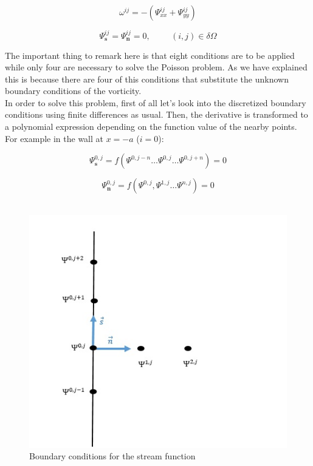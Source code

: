 \begin {equation} \label{cont4}
\omega^{ij}= - (\Psi^{ij} _{xx} + \Psi^{ij} _{yy})
\end{equation}

\begin{equation} \label{BCs10}
 \Psi^{ij}_ \mathbf{s}= \Psi^{ij}_ \mathbf{n}=0, \hspace{1cm} (i,j)\in \delta
 \Omega
\end{equation}

The important thing to remark here is that eight conditions are to be applied
while only four are necessary to solve the Poisson problem. As we have explained
this is because there are four of this conditions that substitute the unknown
boundary conditions of the vorticity. \\

In order to solve this problem, first of all let's look into the discretized
boundary conditions using finite differences as usual. Then, the derivative is
transformed to a polynomial expression depending on the function value of the
nearby points. For example in the wall at $x=-a$ ($i=0$):

\begin{equation} \label{BCs101}
 \Psi^{0,j}_ \mathbf{s} = f(\Psi^{0,j-n} \ldots \Psi^{0,j} \ldots \Psi^{0,j+n}
 )=0
\end{equation}

\begin{equation} \label{BCs102}
 \Psi^{0,j}_ \mathbf{n} = f(\Psi^{0,j}, \Psi^{1,j} \ldots \Psi^{n,j} )=0
\end{equation}\\

\begin{figure}[h]
\centering
\includegraphics[scale=1, trim = 5mm 0mm 30mm 10mm,
clip]{./Figures/4-IVBP/figure_2.jpg}
\caption{Boundary conditions for the stream function}
\label{BC_figure_2}
\end{figure}


